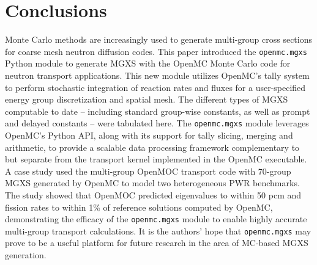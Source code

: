\section{Conclusions}
\label{sec:conclusions}

Monte Carlo methods are increasingly used to generate multi-group cross sections for coarse mesh neutron diffusion codes. This paper introduced the \texttt{openmc.mgxs} Python module to generate MGXS with the OpenMC Monte Carlo code for neutron transport applications. This new module utilizes OpenMC's tally system to perform stochastic integration of reaction rates and fluxes for a user-specified energy group discretization and spatial mesh. The different types of MGXS computable to date -- including standard group-wise constants, as well as prompt and delayed constants -- were tabulated here. The \texttt{openmc.mgxs} module leverages OpenMC's Python API, along with its support for tally slicing, merging and arithmetic, to provide a scalable data processing framework complementary to but separate from the transport kernel implemented in the OpenMC executable. A case study used the multi-group OpenMOC transport code with 70-group MGXS generated by OpenMC to model two heterogeneous PWR benchmarks. The study showed that OpenMOC predicted eigenvalues to within 50 pcm and fission rates to within 1\% of reference solutions computed by OpenMC, demonstrating the efficacy of the \texttt{openmc.mgxs} module to enable highly accurate multi-group transport calculations. It is the authors' hope that \texttt{openmc.mgxs} may prove to be a useful platform for future research in the area of MC-based MGXS generation.

